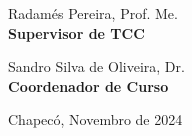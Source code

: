     \vspace{3\baselineskip}
    \noindent
    \begin{minipage}{0.5\textwidth}
        \mdseries
        \SingleSpacing
        \centering

        \textmd{Radamés Pereira}, \textmd{Prof. Me.}\\
        \textbf{Supervisor de TCC}
    \end{minipage}
    \hfill
    \begin{minipage}{0.5\textwidth}
        
            \mdseries
            \SingleSpacing
            \centering

            \textmd{Sandro Silva de Oliveira}, \textmd{Dr.}\\
            \textbf{Coordenador de Curso}
    \end{minipage}

    \vfill
    \begin{center}
        \textmd{Chapecó, Novembro de 2024}
    \end{center}
    \clearpage
    

